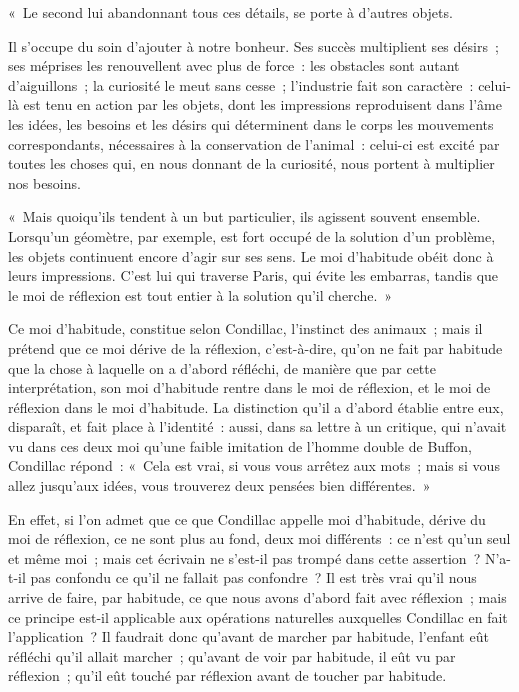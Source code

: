 \documentclass[french,twoside]{book} %
\begin{document}
« Le second lui abandonnant tous ces détails, se porte à d’autres objets.\par
Il s’occupe du soin d’ajouter à notre bonheur. Ses succès multiplient ses désirs ; ses méprises les renouvellent avec plus de force : les obstacles sont autant d’aiguillons ; la curiosité le meut sans cesse ; l’industrie fait son caractère : celui-là est tenu en action par les objets, dont les impressions reproduisent dans l’âme les idées, les besoins et les désirs qui déterminent dans le corps les mouvements correspondants, nécessaires à la conservation de l’animal : celui-ci est excité par toutes les choses qui, en nous donnant de la curiosité, nous portent à multiplier nos besoins.\par
« Mais quoiqu’ils tendent à un but particulier, ils agissent souvent ensemble. Lorsqu’un géomètre, par exemple, est fort occupé de la solution d’un problème, les objets continuent encore d’agir sur ses sens. Le moi d’habitude obéit donc à leurs impressions. C’est lui qui traverse Paris, qui évite les embarras, tandis que le moi de réflexion est tout entier à la solution qu’il cherche. »\par
Ce moi d’habitude, constitue selon Condillac, l’instinct des animaux ; mais il prétend que ce moi dérive de la réflexion, c’est-à-dire, qu’on ne fait par habitude que la chose à laquelle on a d’abord réfléchi, de manière que par cette interprétation, son moi d’habitude rentre dans le moi de réflexion, et le moi de réflexion dans le moi d’habitude. La distinction qu’il a d’abord établie entre eux, disparaît, et fait place à l’identité : aussi, dans sa lettre à un critique, qui n’avait vu dans ces deux moi qu’une faible imitation de l’homme double de Buffon, Condillac répond : « Cela est vrai, si vous vous arrêtez aux mots ; mais si vous allez jusqu’aux idées, vous trouverez deux pensées bien différentes. »\par
En effet, si l’on admet que ce que Condillac appelle moi d’habitude, dérive du moi de réflexion, ce ne sont plus au fond, deux moi différents : ce n’est qu’un seul et même moi ; mais cet écrivain ne s’est-il pas trompé dans cette assertion ? N’a-t-il pas confondu ce qu’il ne fallait pas confondre ? Il est très vrai qu’il nous arrive de faire, par habitude, ce que nous avons d’abord fait avec réflexion ; mais ce principe est-il applicable aux opérations naturelles auxquelles Condillac en fait l’application ? Il faudrait donc qu’avant de marcher par habitude, l’enfant eût réfléchi qu’il allait marcher ; qu’avant de voir par habitude, il eût vu par réflexion ; qu’il eût touché par réflexion avant de toucher par habitude.\par
\end{document}
